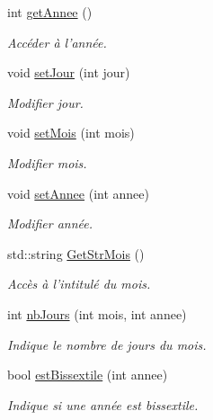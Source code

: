 \begin{DoxyCompactItemize}
int \hyperlink{class_c_date_af37b56e430b856c1b2360cfc7c284bf0}{getAnnee} ()
\begin{DoxyCompactList}\small\item\em Accéder à l'année. \item\end{DoxyCompactList}\item 
void \hyperlink{class_c_date_a9ba9c1985bd904ae24b8d10d580c9dfa}{setJour} (int jour)
\begin{DoxyCompactList}\small\item\em Modifier jour. \item\end{DoxyCompactList}\item 
void \hyperlink{class_c_date_a1d8d023913f19ee53edb9857b5cec7e5}{setMois} (int mois)
\begin{DoxyCompactList}\small\item\em Modifier mois. \item\end{DoxyCompactList}\item 
void \hyperlink{class_c_date_a3340b3febf97ddad564a26784cd739da}{setAnnee} (int annee)
\begin{DoxyCompactList}\small\item\em Modifier année. \item\end{DoxyCompactList}\item 
std::string \hyperlink{class_c_date_ab821249870921bdffedb18da199f5891}{GetStrMois} ()
\begin{DoxyCompactList}\small\item\em Accès à l'intitulé du mois. \item\end{DoxyCompactList}\item 
int \hyperlink{class_c_date_a04a7801cc2f9441321735bf41602d3b2}{nbJours} (int mois, int annee)
\begin{DoxyCompactList}\small\item\em Indique le nombre de jours du mois. \item\end{DoxyCompactList}\item 
bool \hyperlink{class_c_date_a02dad71347f444a5ee5a889f62fb5f4e}{estBissextile} (int annee)
\begin{DoxyCompactList}\small\item\em Indique si une année est bissextile. \item\end{DoxyCompactList}\item 

\end{DoxyCompactItemize}
